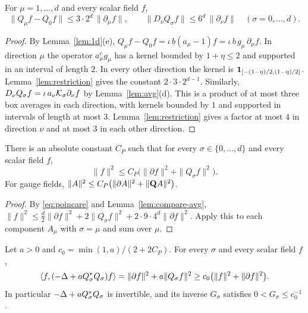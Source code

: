 \begin{lemma}\label{lem:compare-avg}
For $\mu=1,\dots,d$ and every scalar field $f$,
\[
\|Q_\mu f-Q_0f\|\le 3\cdot2^d\,\|\partial_\mu f\|,\qquad
\|D_\nu Q_\sigma f\|\le 6^d\,\|\partial_\nu f\|\quad(\sigma=0,\dots,d).
\]
\end{lemma}

\begin{proof}
By Lemma~\ref{lem:1d}(e), $Q_\mu f-Q_0f=\iota\,b(a_\mu-1)f=\iota\,b\,g_\mu\,\partial_\mu f$. In direction $\mu$ the operator $a^c_\mu g_\mu$ has a kernel bounded by $1+\eta\le2$ and supported in an interval of length $2$. In every other direction the kernel is $\mathbf 1_{[-(1-\eta)/2,(1-\eta)/2]}$. Lemma~\ref{lem:restriction} gives the constant $2\cdot3\cdot2^{d-1}$. Similarly, $D_\nu Q_\sigma f=\iota\,a_\nu\mathcal K_\sigma\partial_\nu f$ by Lemma~\ref{lem:avg}(d). This is a product of at most three box averages in each direction, with kernels bounded by $1$ and supported in intervals of length at most $3$. Lemma~\ref{lem:restriction} gives a factor at most $4$ in direction $\nu$ and at most $3$ in each other direction.
\end{proof}

\begin{corollary}\label{cor:poincare-all}
There is an absolute constant $C_P$ such that for every $\sigma\in\{0,\dots,d\}$ and every scalar field $f$,
\[
\|f\|^2\le C_P\big(\|\partial f\|^2+\|Q_\sigma f\|^2\big).
\]
For gauge fields, $\|A\|^2\le C_P\big(\|\partial A\|^2+\|\mathbf Q A\|^2\big)$.
\end{corollary}

\begin{proof}
By \eqref{eq:poincare} and Lemma~\ref{lem:compare-avg}, $\|f\|^2\le\frac d2\|\partial f\|^2+2\|Q_\sigma f\|^2+2\cdot9\cdot4^d\|\partial f\|^2$. Apply this to each component $A_\mu$ with $\sigma=\mu$ and sum over $\mu$.
\end{proof}

\begin{corollary}\label{cor:scalar-coercive}
Let $a>0$ and $c_0=\min(1,a)/(2+2C_P)$. For every $\sigma$ and every scalar field $f$,
\[
\langle f,(-\Delta+aQ_\sigma^*Q_\sigma)f\rangle=\|\partial f\|^2+a\|Q_\sigma f\|^2\ge c_0\big(\|f\|^2+\|\partial f\|^2\big).
\]
In particular $-\Delta+aQ_\sigma^*Q_\sigma$ is invertible, and its inverse $G_\sigma$ satisfies $0<G_\sigma\le c_0^{-1}$.
\end{corollary}


